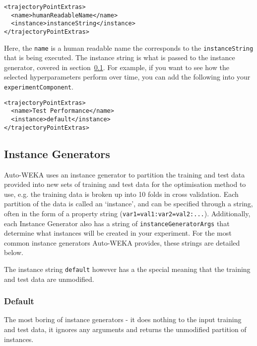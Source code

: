 \begin{verbatim}
<trajectoryPointExtras>
  <name>humanReadableName</name>
  <instance>instanceString</instance>
</trajectoryPointExtras>
\end{verbatim}

Here, the \texttt{name} is a human readable name the corresponds to the \texttt{instanceString} that is being executed. The instance string is what is passed to the instance generator, covered in section~\ref{sec:instancegenerators}. For example, if you want to see how the selected hyperparameters perform over time, you can add the following into your \texttt{experimentComponent}.%

\begin{verbatim}
<trajectoryPointExtras>
  <name>Test Performance</name>
  <instance>default</instance>
</trajectoryPointExtras>
\end{verbatim}

\subsection{Instance Generators}\label{sec:instancegenerators}

Auto-WEKA uses an instance generator to partition the training and test data provided into new sets of training and test data for the optimisation method to use, e.g. the training data is broken up into 10 folds in cross validation. Each partition of the data is called an `instance', and can be specified through a string, often in the form of a property string (\texttt{var1=val1:var2=val2:...}). Additionally, each Instance Generator also has a string of \texttt{instanceGeneratorArgs} that determine what instances will be created in your experiment. For the most common instance generators Auto-WEKA provides, these strings are detailed below.

\begin{aside}
The instance string \texttt{default} however has a the special meaning that the training and test data are unmodified.
\end{aside}

\subsubsection{Default}

The most boring of instance generators - it does nothing to the input training and test data, it ignores any arguments and returns the unmodified partition of instances.

